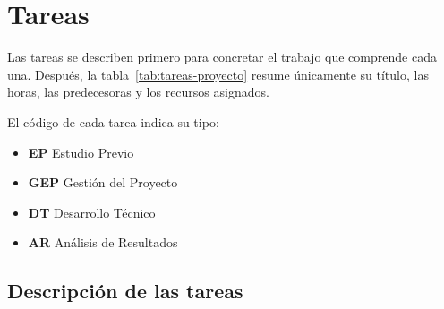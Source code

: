 \section{Tareas}

Las tareas se describen primero para concretar el trabajo que comprende cada
una. Después, la tabla~\ref{tab:tareas-proyecto} resume únicamente su título,
las horas, las predecesoras y los recursos asignados.

El código de cada tarea indica su tipo:
\begin{itemize}
  \item \textbf{EP} Estudio Previo
  \item \textbf{GEP} Gestión del Proyecto
  \item \textbf{DT} Desarrollo Técnico
  \item \textbf{AR} Análisis de Resultados
\end{itemize}

\subsection{Descripción de las tareas}

\newcommand{\taskdescription}[4]{%
  \item \textbf{#3}\hfill{\small\texttt{#1}\enspace (#2\,h)}\par\smallskip
  #4%
}


